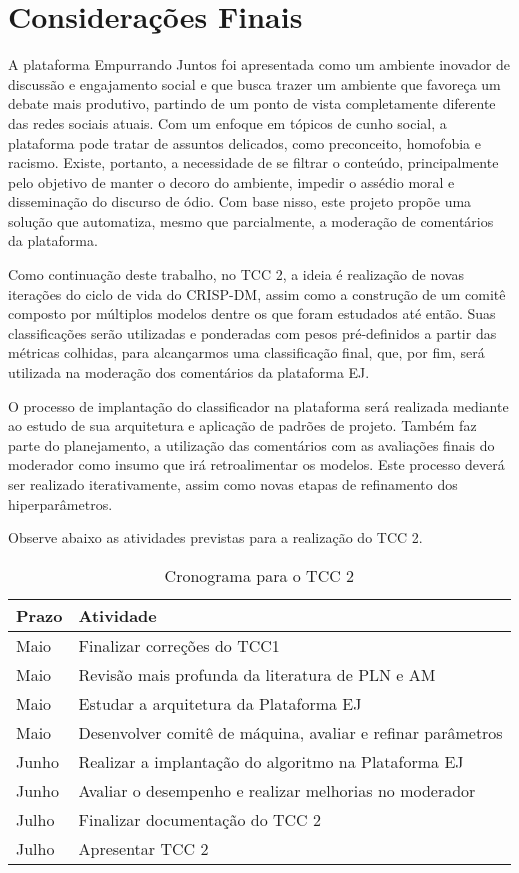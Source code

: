 \chapter{Considerações Finais}

A plataforma Empurrando Juntos foi apresentada como um ambiente inovador de discussão e engajamento social e que busca trazer um ambiente que favoreça um debate mais produtivo, partindo de um ponto de vista completamente diferente das redes sociais atuais. Com um enfoque em tópicos de cunho social, a plataforma pode tratar de assuntos delicados, como preconceito, homofobia e racismo. Existe, portanto, a necessidade de se filtrar o conteúdo, principalmente pelo objetivo de manter o decoro do ambiente, impedir o assédio moral e disseminação do discurso de ódio. Com base nisso, este projeto propõe uma solução que automatiza, mesmo que parcialmente, a moderação de comentários da plataforma.

Como continuação deste trabalho, no TCC 2, a ideia é realização de novas iterações do ciclo de vida do CRISP-DM, assim como a construção de um comitê composto por múltiplos modelos dentre os que foram estudados até então. Suas classificações serão utilizadas e ponderadas com pesos pré-definidos a partir das métricas colhidas, para alcançarmos uma classificação final, que, por fim, será utilizada na moderação dos comentários da plataforma EJ.
	
O processo de implantação do classificador na plataforma será realizada mediante ao estudo de sua arquitetura e aplicação de padrões de projeto. Também faz parte do planejamento, a utilização das comentários com as avaliações finais do moderador como insumo que irá retroalimentar os modelos. Este processo deverá ser realizado iterativamente, assim como novas etapas de refinamento dos hiperparâmetros.

Observe abaixo as atividades previstas para a realização do TCC 2.

\begin{table}[htbp]
\centering
\begin{tabular}{@{}ll@{}}
\toprule
\textbf{Prazo} & \textbf{Atividade} \\ \midrule
Maio & Finalizar correções do TCC1 \\
Maio & Revisão mais profunda da literatura de PLN e AM \\
Maio & Estudar a arquitetura da Plataforma EJ \\
Maio & Desenvolver comitê de máquina, avaliar e refinar parâmetros \\
Junho & Realizar a implantação do algoritmo na Plataforma EJ \\
Junho & Avaliar o desempenho e realizar melhorias no moderador \\
Julho & Finalizar documentação do TCC 2 \\
Julho & Apresentar TCC 2 \\ \bottomrule
\end{tabular}
\caption{Cronograma para o TCC 2}
\label{tab:crono-tcc2}
\end{table}

